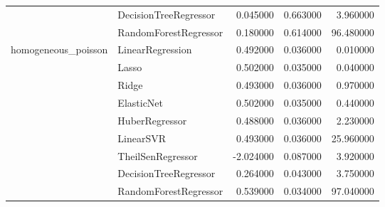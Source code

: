 \begin{tabular}{llrrr}
 & DecisionTreeRegressor & 0.045000 & 0.663000 & 3.960000 \\
 & RandomForestRegressor & 0.180000 & 0.614000 & 96.480000 \\
\cline{1-5}
\multirow[t]{9}{*}{homogeneous_poisson} & LinearRegression & 0.492000 & 0.036000 & 0.010000 \\
 & Lasso & 0.502000 & 0.035000 & 0.040000 \\
 & Ridge & 0.493000 & 0.036000 & 0.970000 \\
 & ElasticNet & 0.502000 & 0.035000 & 0.440000 \\
 & HuberRegressor & 0.488000 & 0.036000 & 2.230000 \\
 & LinearSVR & 0.493000 & 0.036000 & 25.960000 \\
 & TheilSenRegressor & -2.024000 & 0.087000 & 3.920000 \\
 & DecisionTreeRegressor & 0.264000 & 0.043000 & 3.750000 \\
 & RandomForestRegressor & 0.539000 & 0.034000 & 97.040000 \\
\cline{1-5}
\bottomrule
\end{tabular}
